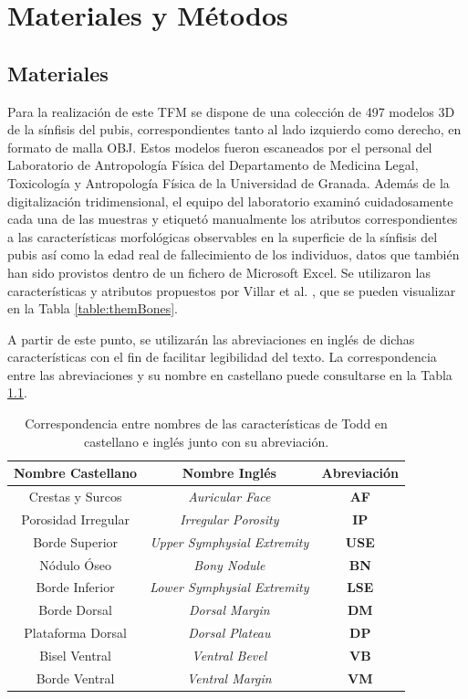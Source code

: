 \chapter{Materiales y Métodos}

\section{Materiales}
\label{section4:materials}
Para la realización de este TFM se dispone de una colección de 497 modelos 3D de la sínfisis del pubis, correspondientes tanto al lado izquierdo como derecho, en formato de malla OBJ. Estos modelos fueron escaneados por el personal del Laboratorio de Antropología Física del Departamento de Medicina Legal, Toxicología y Antropología Física de la Universidad de Granada. Además de la digitalización tridimensional, el equipo del laboratorio examinó cuidadosamente cada una de las muestras y etiquetó manualmente los atributos correspondientes a las características morfológicas observables en la superficie de la sínfisis del pubis así como la edad real de fallecimiento de los individuos, datos que también han sido provistos dentro de un fichero de Microsoft Excel. Se utilizaron las características y atributos propuestos por Villar et al. \cite{villar2017first}, que se pueden visualizar en la Tabla \ref{table:themBones}.

A partir de este punto, se utilizarán las abreviaciones en inglés de dichas características con el fin de facilitar legibilidad del texto. La correspondencia entre las abreviaciones y su nombre en castellano puede consultarse en la Tabla \ref{table4:chars_short_names}.

\begin{table}[h]
    \centering
    \begin{tabular}{|c|c|c|}
    \hline
    \rowcolor[HTML]{D33333} 
    {\color[HTML]{FFFFFF} Nombre Castellano} & {\color[HTML]{FFFFFF} Nombre Inglés} & {\color[HTML]{FFFFFF} Abreviación} \\ \hline
    Crestas y Surcos & \textit{Auricular Face} & \textbf{AF} \\ \hline
    Porosidad Irregular & \textit{Irregular Porosity} & \textbf{IP} \\ \hline
    Borde Superior & \textit{Upper Symphysial Extremity} & \textbf{USE} \\ \hline
    Nódulo Óseo & \textit{Bony Nodule} & \textbf{BN} \\ \hline
    Borde Inferior & \textit{Lower Symphysial Extremity} & \textbf{LSE} \\ \hline
    Borde Dorsal & \textit{Dorsal Margin} & \textbf{DM} \\ \hline
    Plataforma Dorsal & \textit{Dorsal Plateau} & \textbf{DP} \\ \hline
    Bisel Ventral & \textit{Ventral Bevel} & \textbf{VB} \\ \hline
    Borde Ventral & \textit{Ventral Margin} & \textbf{VM} \\ \hline
    \end{tabular}
    \caption{Correspondencia entre nombres de las características de Todd en castellano e inglés junto con su abreviación.}
    \label{table4:chars_short_names}
\end{table}

